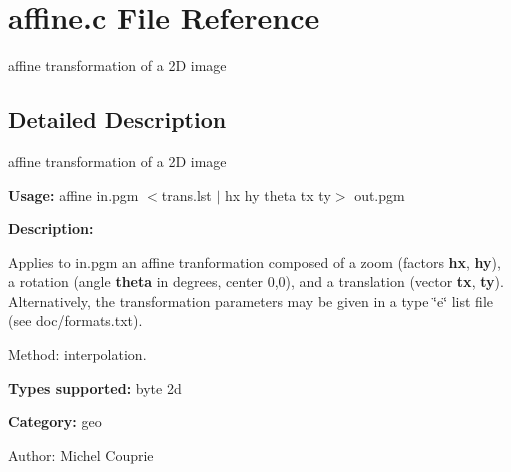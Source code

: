 \section{affine.c File Reference}
\label{affine_8c}
affine transformation of a 2D image  




\label{_details}
\subsection{Detailed Description}
affine transformation of a 2D image 

{\bf Usage:} affine in.pgm $<$trans.lst $|$ hx hy theta tx ty$>$ out.pgm

{\bf Description:}

Applies to in.pgm an affine tranformation composed of a zoom (factors {\bf hx}, {\bf hy}), a rotation (angle {\bf theta} in degrees, center 0,0), and a translation (vector {\bf tx}, {\bf ty}). Alternatively, the transformation parameters may be given in a type \char`\"{}e\char`\"{} list file (see doc/formats.txt).

Method: interpolation.

{\bf Types supported:} byte 2d

{\bf Category:} geo

\begin{Desc}
\item[Author:]Michel Couprie \end{Desc}
